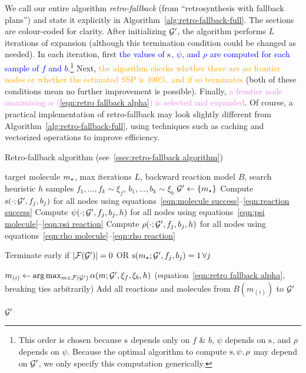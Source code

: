 We call our entire algorithm \emph{retro-fallback} (from ``retrosynthesis with fallback plans'')
and state it explicitly in Algorithm~\ref{alg:retro-fallback-full}.
The sections are colour-coded for clarity.
After initializing ${\mathcal{G}}'$, the algorithm performs
$L$ iterations of expansion
(although this termination condition could be changed as needed).
In each iteration, first \textcolor{blue}{the values of ${\textnormal{s}}$, $\psi$, and $\rho$ are computed for each sample of $f$ and $b$}.\footnote{
This order is chosen because ${\textnormal{s}}$ depends only on $f$ \& $b$, $\psi$ depends on ${\textnormal{s}}$, and $\rho$ depends on $\psi$.
Because the optimal algorithm to compute ${\textnormal{s}},\psi,\rho$ may depend on ${\mathcal{G}}'$,
we only specify this computation generically.
}
Next, \textcolor{orange}{the algorithm checks whether there are no frontier nodes or whether the estimated SSP is 100\%, and if so terminates}
(both of these conditions mean no further improvement is possible).
Finally, \textcolor{violet}{a frontier node maximising $\alpha$ (\ref{eqn:retro fallback alpha}) is selected and expanded}.
Of course, a practical implementation of retro-fallback may look slightly different from Algorithm~\ref{alg:retro-fallback-full},
using techniques such as caching and vectorized operations to improve efficiency.

\begin{algorithm}[tb]
\caption{Retro-fallback algorithm (see~\ref{ssec:retro-fallback algorithm})}\label{alg:retro-fallback-full}
\begin{algorithmic}[1]
\REQUIRE target molecule $m_\star$, max iterations $L$, backward reaction model $B$, search heuristic $h$
\REQUIRE samples $f_1,\ldots,f_k\sim\xi_f$, $b_1,\ldots,b_k\sim\xi_b$
\STATE ${\mathcal{G}}'\gets \{m_\star\}$
    {
    \color{blue} 
        \STATE Compute ${\textnormal{s}}(\cdot;{\mathcal{G}}',f_j,b_j)$ for all nodes using equations~\ref{eqn:molecule success}--\ref{eqn:reaction success}
        \STATE Compute $\psi(\cdot;{\mathcal{G}}',f_j,b_j,h)$ for all nodes using equations~\ref{eqn:psi molecule}--\ref{eqn:psi reaction}
        \STATE Compute $\rho(\cdot;{\mathcal{G}}',f_j,b_j,h)$ for all nodes using equations~\ref{eqn:rho molecule}--\ref{eqn:rho reaction}
    \ENDFOR
    }

    {\color{orange}
    \STATE\label{early termination} Terminate early if $|\mathcal{F}({\mathcal{G}}')|=0$ OR ${\textnormal{s}}(m_\star;{\mathcal{G}}',f_j,b_j)=1 \,\forall j$}

    {\color{violet}
    \STATE $m_{(i)}\gets \arg\max_{m\in \mathcal{F}({\mathcal{G}}')}\alpha(m;{\mathcal{G}}',\xi_f,\xi_b, h)$ (equation~\ref{eqn:retro fallback alpha}, breaking ties arbitrarily) 
    \STATE Add all reactions and molecules from $B(m_{(i)})$ to ${\mathcal{G}}'$
    }
\ENDFOR
    
\RETURN ${\mathcal{G}}'$
\end{algorithmic}
\end{algorithm}






